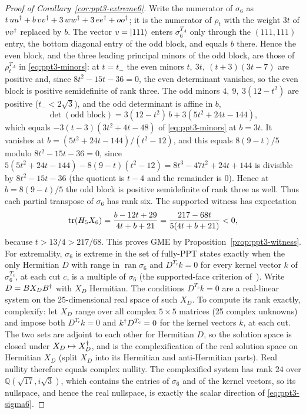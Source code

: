 \begin{proof}[Proof of Corollary~\ref{cor:ppt3-extreme6}]
Write the numerator of $\sigma_6$ as $t\,uu^{\dagger}+b\,vv^{\dagger}+3\,ww^{\dagger}+3\,ee^{\dagger}+oo^{\dagger}$; it is the numerator of
$\rho_t$ with the weight $3t$ of $vv^{\dagger}$ replaced by $b$. The vector $v=\lvert111\rangle$ enters $\sigma_6^{T_A}$ only through the
$(111,111)$ entry, the bottom diagonal entry of the odd block, and equals $b$ there. Hence the even block, and the three leading
principal minors of the odd block, are those of $\rho_t^{T_A}$ in \eqref{eq:ppt3-minors}: at $t=t_-$ the even minors
$t,\ 3t,\ (t+3)(3t-7)$ are positive and, since $8t^2-15t-36=0$, the even determinant vanishes, so the even block is positive
semidefinite of rank three. The odd minors $4,\ 9,\ 3(12-t^2)$ are positive ($t_-<2\sqrt3$), and the odd determinant is
affine in $b$,
\[
 \det(\text{odd block})=3(12-t^2)\,b+3(5t^2+24t-144),
\]
which equals $-3(t-3)(3t^2+4t-48)$ of \eqref{eq:ppt3-minors} at $b=3t$. It vanishes at
$b=(5t^2+24t-144)/(t^2-12)$, and this equals $8(9-t)/5$ modulo $8t^2-15t-36=0$, since
$5(5t^2+24t-144)-8(9-t)(t^2-12)=8t^3-47t^2+24t+144$ is divisible by $8t^2-15t-36$
(the quotient is $t-4$ and the remainder is $0$).
Hence at $b=8(9-t)/5$ the odd block is positive semidefinite of rank three as well. Thus each partial transpose of $\sigma_6$ has
rank six.
The supported witness has expectation
\[
\operatorname{tr}(H_5X_6)
=\frac{b-12t+29}{4t+b+21}
=\frac{217-68t}{5(4t+b+21)}<0,
\]
because $t>13/4>217/68$. This proves GME by
Proposition~\ref{prop:ppt3-witness}.
For extremality, $\sigma_6$ is extreme in the set of fully-PPT states exactly when the only Hermitian $D$ with range in $\operatorname{ran}\sigma_6$
and $D^{T_c}k=0$ for every kernel vector $k$ of $\sigma_6^{T_c}$, at each cut $c$, is a multiple of $\sigma_6$ (the supported-face
criterion of~\cite{GIM}). Write $D=BX_DB^{\dagger}$ with $X_D$ Hermitian. The conditions
$D^{T_c}k=0$ are a real-linear system on the $25$-dimensional real space of such $X_D$. To compute its rank exactly, complexify:
let $X_D$ range over all complex $5\times5$ matrices (25 complex unknowns) and impose both $D^{T_c}k=0$ and $k^{\dagger} D^{T_c}=0$ for the
kernel vectors $k$, at each cut. The two sets are adjoint to each other for Hermitian $D$, so the solution space is closed under
$X_D\mapsto X_D^{\dagger}$, and is the complexification of the real solution space on Hermitian $X_D$ (split $X_D$ into its
Hermitian and anti-Hermitian parts). Real nullity therefore equals complex nullity. The complexified system has rank $24$ over
$\mathbb Q(\sqrt{17},i\sqrt3)$, which contains the entries of $\sigma_6$ and of the kernel vectors, so its nullspace, and hence the
real nullspace, is exactly the scalar direction of \eqref{eq:ppt3-sigma6}.
\end{proof}

